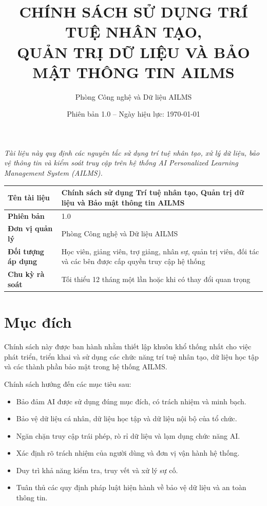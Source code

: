\documentclass[12pt,a4paper]{article}
\title{
    \textbf{\LARGE CHÍNH SÁCH SỬ DỤNG TRÍ TUỆ NHÂN TẠO,\\
    QUẢN TRỊ DỮ LIỆU VÀ BẢO MẬT THÔNG TIN AILMS}
}
\author{Phòng Công nghệ và Dữ liệu AILMS}
\date{Phiên bản 1.0 -- Ngày hiệu lực: \today}
\begin{document}
\maketitle

\begin{center}
    \textit{Tài liệu này quy định các nguyên tắc sử dụng trí tuệ nhân tạo, xử lý dữ liệu,
    bảo vệ thông tin và kiểm soát truy cập trên hệ thống AI Personalized Learning
    Management System (AILMS).}
\end{center}

\vspace{1cm}

\begin{longtable}{|>{\bfseries}p{4cm}|p{9.5cm}|}
    \hline
    Tên tài liệu &
    Chính sách sử dụng Trí tuệ nhân tạo, Quản trị dữ liệu và Bảo mật thông tin AILMS \\
    \hline
    Phiên bản & 1.0 \\
    \hline
    Đơn vị quản lý & Phòng Công nghệ và Dữ liệu AILMS \\
    \hline
    Đối tượng áp dụng &
    Học viên, giảng viên, trợ giảng, nhân sự, quản trị viên,
    đối tác và các bên được cấp quyền truy cập hệ thống \\
    \hline
    Chu kỳ rà soát & Tối thiểu 12 tháng một lần hoặc khi có thay đổi quan trọng \\
    \hline
\end{longtable}

\tableofcontents
\newpage

\section{Mục đích}

Chính sách này được ban hành nhằm thiết lập khuôn khổ thống nhất cho việc phát triển,
triển khai và sử dụng các chức năng trí tuệ nhân tạo, dữ liệu học tập và các thành phần
bảo mật trong hệ thống AILMS.

Chính sách hướng đến các mục tiêu sau:

\begin{itemize}
    \item Bảo đảm AI được sử dụng đúng mục đích, có trách nhiệm và minh bạch.
    \item Bảo vệ dữ liệu cá nhân, dữ liệu học tập và dữ liệu nội bộ của tổ chức.
    \item Ngăn chặn truy cập trái phép, rò rỉ dữ liệu và lạm dụng chức năng AI.
    \item Xác định rõ trách nhiệm của người dùng và đơn vị vận hành hệ thống.
    \item Duy trì khả năng kiểm tra, truy vết và xử lý sự cố.
    \item Tuân thủ các quy định pháp luật hiện hành về bảo vệ dữ liệu và an toàn thông tin.
\end{itemize}
\end{document}
